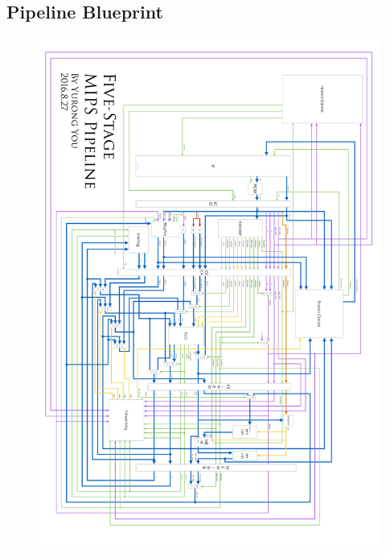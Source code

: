 \documentclass[paper=a4, fontsize=11pt]{scrartcl} %
\numberwithin{equation}{section} %
\numberwithin{figure}{section} %
\numberwithin{table}{section} %
\begin{document}
\begin{spacing}{1.5}
\begin{appendices}
    \section{Pipeline Blueprint}
    	\label{app::blueprint}
	    \begin{figure}[!htb]
	    	\centering
	    	\includegraphics[angle=90,origin=c, width = 15cm]{blueprint}	    	
	    \end{figure}
\end{appendices}
\end{spacing}
\end{document}
